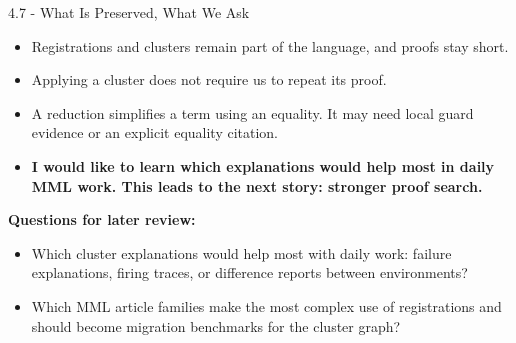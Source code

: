 \documentclass[aspectratio=169,11pt]{beamer}
\begin{document}
\begin{frame}[fragile,t]{4.7 - What Is Preserved, What We Ask}
\begin{itemize}
\setlength{\itemsep}{1pt}
\setlength{\parsep}{0pt}
\setlength{\parskip}{0pt}
\item Registrations and clusters remain part of the language, and proofs stay short.
\item Applying a cluster does not require us to repeat its proof.
\item A reduction simplifies a term using an equality. It may need local guard evidence or an explicit equality citation.
\item \textcolor{blue!55!black}{\textbf{I would like to learn which explanations would help most in daily MML work. This leads to the next story: stronger proof search.}}
\end{itemize}
\smallskip
\textbf{Questions for later review:}
\begin{itemize}
\setlength{\itemsep}{1pt}
\setlength{\parsep}{0pt}
\setlength{\parskip}{0pt}
\item Which cluster explanations would help most with daily work: failure explanations, firing traces, or difference reports between environments?
\item Which MML article families make the most complex use of registrations and should become migration benchmarks for the cluster graph?
\end{itemize}
\end{frame}
\end{document}
